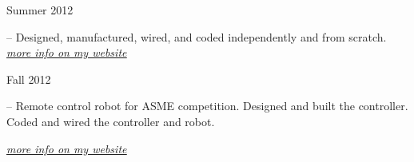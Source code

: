 
\flushleft \begin{minipage}[t]{\dateColWidth}
Summer 2012
\end{minipage}
\begin{minipage}[t]{0.8\textwidth}
	--
	Designed, manufactured, wired, and coded independently and from scratch.
	\\[0.2 em]
	\href{http://www.claytonketner.com/robotic-arm-mk2/}{\uline{\textit{more info on my website}}}
\end{minipage}

\divLine

\flushleft \begin{minipage}[t]{\dateColWidth}
Fall 2012
\end{minipage}
\begin{minipage}[t]{0.8\textwidth}
	--
	Remote control robot for ASME competition. Designed and built the controller. Coded and wired the controller and robot.

	\href{http://www.claytonketner.com/senior-project-robot/}{\uline{\textit{more info on my website}}}
\end{minipage}
